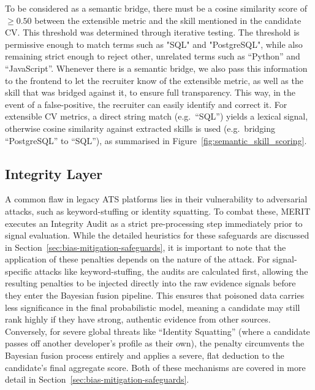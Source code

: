To be considered as a semantic bridge, there must be a cosine similarity score of $\geq 0.50$ between
the extensible metric and the skill mentioned in the candidate CV. This threshold was determined 
through iterative testing. The threshold is permissive enough to match terms such as "SQL" and "PostgreSQL",
while also remaining strict enough to reject other, unrelated terms such as ``Python'' and ``JavaScript''.
Whenever there is a semantic bridge, we also pass this information to the frontend to let the recruiter know
of the extensible metric, as well as the skill that was bridged against it, to ensure full transparency.
This way, in the event of a false-positive, the recruiter can easily identify and correct it.
For extensible CV metrics, a direct string match (e.g.\ ``SQL'') yields a lexical signal, otherwise cosine similarity
against extracted skills is used (e.g.\ bridging ``PostgreSQL'' to ``SQL''), as summarised in Figure~\ref{fig:semantic_skill_scoring}.




\subsection{Integrity Layer}
A common flaw in legacy ATS platforms lies in their vulnerability to adversarial attacks, such as
keyword-stuffing or identity squatting. To combat these, MERIT executes an Integrity Audit as a strict
pre-processing step immediately prior to signal evaluation. While the detailed heuristics for
these safeguards are discussed in Section~\ref{sec:bias-mitigation-safeguards}, 
it is important to note that the application of these penalties depends on the nature of the attack. 
For signal-specific attacks like keyword-stuffing, the audits are calculated first, allowing the resulting penalties to be
injected directly into the raw evidence signals before they enter the Bayesian fusion pipeline. This ensures that
poisoned data carries less significance in the final probabilistic model, meaning a candidate may
still rank highly if they have strong, authentic evidence from other sources. Conversely, for severe global threats 
like ``Identity Squatting'' (where a candidate passes off another developer's profile as their own), the penalty circumvents 
the Bayesian fusion process entirely and applies a severe, flat deduction to the candidate's final aggregate score. 
Both of these mechanisms are covered in more detail in Section~\ref{sec:bias-mitigation-safeguards}.

